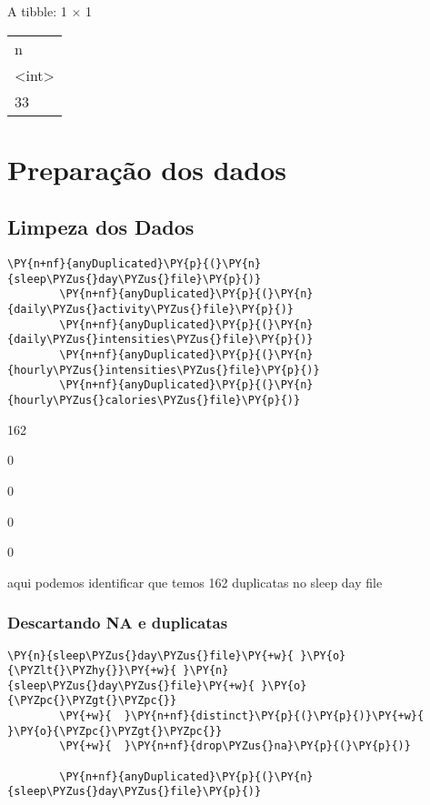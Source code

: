 A tibble: 1 × 1
\begin{tabular}{l}
    n     \\
    <int> \\
    \hline
    33    \\
\end{tabular}



\section{Preparação dos dados}

\subsection{Limpeza dos Dados}

\begin{tcolorbox}[breakable, size=fbox, boxrule=1pt, pad at break*=1mm,colback=cellbackground, colframe=cellborder]
    \begin{Verbatim}[commandchars=\\\{\}]
        \PY{n+nf}{anyDuplicated}\PY{p}{(}\PY{n}{sleep\PYZus{}day\PYZus{}file}\PY{p}{)}
        \PY{n+nf}{anyDuplicated}\PY{p}{(}\PY{n}{daily\PYZus{}activity\PYZus{}file}\PY{p}{)}
        \PY{n+nf}{anyDuplicated}\PY{p}{(}\PY{n}{daily\PYZus{}intensities\PYZus{}file}\PY{p}{)}
        \PY{n+nf}{anyDuplicated}\PY{p}{(}\PY{n}{hourly\PYZus{}intensities\PYZus{}file}\PY{p}{)}
        \PY{n+nf}{anyDuplicated}\PY{p}{(}\PY{n}{hourly\PYZus{}calories\PYZus{}file}\PY{p}{)}
    \end{Verbatim}
\end{tcolorbox}

162


0


0


0


0


aqui podemos identificar que temos 162 duplicatas no sleep day file

\subsubsection{Descartando NA e duplicatas}

\begin{tcolorbox}[breakable, size=fbox, boxrule=1pt, pad at break*=1mm,colback=cellbackground, colframe=cellborder]
    \begin{Verbatim}[commandchars=\\\{\}]
        \PY{n}{sleep\PYZus{}day\PYZus{}file}\PY{+w}{ }\PY{o}{\PYZlt{}\PYZhy{}}\PY{+w}{ }\PY{n}{sleep\PYZus{}day\PYZus{}file}\PY{+w}{ }\PY{o}{\PYZpc{}\PYZgt{}\PYZpc{}}
        \PY{+w}{  }\PY{n+nf}{distinct}\PY{p}{(}\PY{p}{)}\PY{+w}{ }\PY{o}{\PYZpc{}\PYZgt{}\PYZpc{}}
        \PY{+w}{  }\PY{n+nf}{drop\PYZus{}na}\PY{p}{(}\PY{p}{)}

        \PY{n+nf}{anyDuplicated}\PY{p}{(}\PY{n}{sleep\PYZus{}day\PYZus{}file}\PY{p}{)}
    \end{Verbatim}
\end{tcolorbox}

